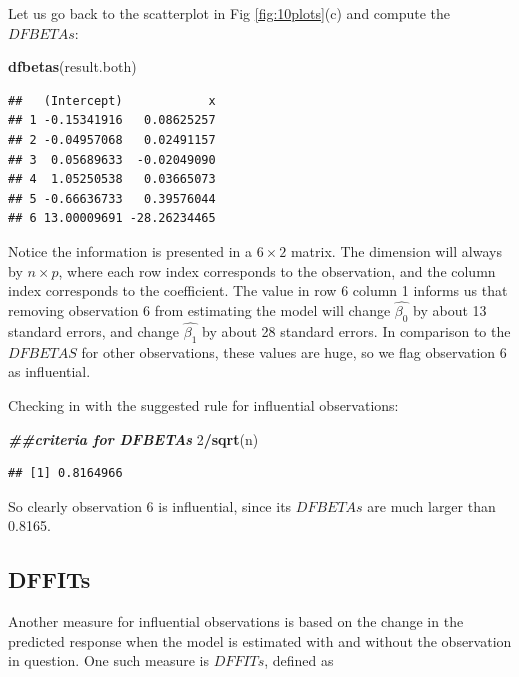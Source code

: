 \documentclass[
]{book}
\newenvironment{Shaded}{\begin{snugshade}}{\end{snugshade}}
\newcommand{\DecValTok}[1]{\textcolor[rgb]{0.00,0.00,0.81}{#1}}
\newcommand{\DocumentationTok}[1]{\textcolor[rgb]{0.56,0.35,0.01}{\textbf{\textit{#1}}}}
\newcommand{\FunctionTok}[1]{\textcolor[rgb]{0.13,0.29,0.53}{\textbf{#1}}}
\newcommand{\NormalTok}[1]{#1}
\newcommand{\SpecialCharTok}[1]{\textcolor[rgb]{0.81,0.36,0.00}{\textbf{#1}}}
\begin{document}
Let us go back to the scatterplot in Fig \ref{fig:10plots}(c) and compute the \(DFBETAs\):

\begin{Shaded}
\begin{Highlighting}[]
\FunctionTok{dfbetas}\NormalTok{(result.both)}
\end{Highlighting}
\end{Shaded}

\begin{verbatim}
##   (Intercept)            x
## 1 -0.15341916   0.08625257
## 2 -0.04957068   0.02491157
## 3  0.05689633  -0.02049090
## 4  1.05250538   0.03665073
## 5 -0.66636733   0.39576044
## 6 13.00009691 -28.26234465
\end{verbatim}

Notice the information is presented in a \(6 \times 2\) matrix. The dimension will always by \(n \times p\), where each row index corresponds to the observation, and the column index corresponds to the coefficient. The value in row 6 column 1 informs us that removing observation 6 from estimating the model will change \(\hat{\beta_0}\) by about 13 standard errors, and change \(\hat{\beta_1}\) by about 28 standard errors. In comparison to the \(DFBETAS\) for other observations, these values are huge, so we flag observation 6 as influential.

Checking in with the suggested rule for influential observations:

\begin{Shaded}
\begin{Highlighting}[]
\DocumentationTok{\#\#criteria for DFBETAs}
\DecValTok{2}\SpecialCharTok{/}\FunctionTok{sqrt}\NormalTok{(n)}
\end{Highlighting}
\end{Shaded}

\begin{verbatim}
## [1] 0.8164966
\end{verbatim}

So clearly observation 6 is influential, since its \(DFBETAs\) are much larger than 0.8165.

\hypertarget{dffits}{%
\subsection{DFFITs}\label{dffits}}

Another measure for influential observations is based on the change in the predicted response when the model is estimated with and without the observation in question. One such measure is \(DFFITs\), defined as
\end{document}
